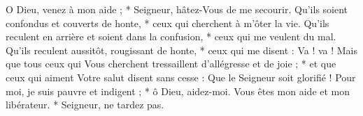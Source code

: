  O Dieu, venez à mon aide ; * Seigneur, hâtez-Vous de me secourir.
\versseparator
 Qu'ils soient confondus et couverts de honte, * ceux qui cherchent à m'ôter la vie.
\versseparator
 Qu'ils reculent en arrière et soient dans la confusion, * ceux qui me veulent du mal.
\versseparator
 Qu'ils reculent aussitôt, rougissant de honte, * ceux qui me disent : Va ! va !
\versseparator
 Mais que tous ceux qui Vous cherchent tressaillent d'allégresse et de joie ; * et que ceux qui aiment Votre salut disent sans cesse : Que le Seigneur soit glorifié !
\versseparator
 Pour moi, je suis pauvre et indigent ; * ô Dieu, aidez-moi.
\versseparator
 Vous êtes mon aide et mon libérateur. * Seigneur, ne tardez pas.